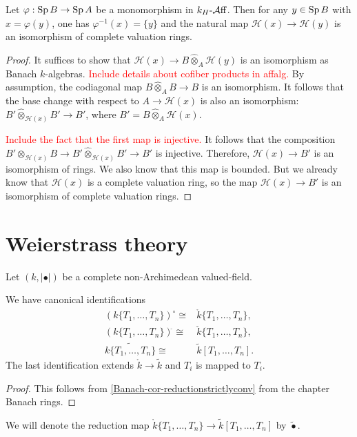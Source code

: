 \begin{proposition}
    Let $\varphi:\operatorname{Sp} B\rightarrow \operatorname{Sp} A$ be a monomorphism in $k_H\text{-}\mathcal{A}\mathrm{ff}$. Then for any $y\in \operatorname{Sp} B$ with $x=\varphi(y)$, one has $\varphi^{-1}(x)=\{y\}$ and the natural map $\mathscr{H}(x)\rightarrow \mathscr{H}(y)$ is an isomorphism of complete valuation rings.
\end{proposition}
\begin{proof}
    It suffices to show that $\mathscr{H}(x)\rightarrow B\hat{\otimes}_A \mathscr{H}(y)$ is an isomorphism as Banach $k$-algebras. \textcolor{red}{Include details about cofiber products in affalg.} By assumption, the codiagonal map $B\hat{\otimes}_A B\rightarrow B$ is an isomorphism. It follows that the base change with respect to $A\rightarrow \mathscr{H}(x)$ is also an isomorphism: $B'\hat{\otimes}_{\mathscr{H}(x)}B'\rightarrow B'$, where $B'=B\hat{\otimes}_A \mathscr{H}(x)$.

    \textcolor{red}{Include the fact that the first map is injective.}
    It follows that the composition $B'\otimes_{\mathscr{H}(x)}B\rightarrow B'\hat{\otimes}_{\mathscr{H}(x)}B'\rightarrow B'$ is injective.
    Therefore, $\mathscr{H}(x)\rightarrow B'$ is an isomorphism of rings.  We also know that this map is bounded.
    But we already know that $\mathscr{H}(x)$ is a complete valuation ring, so the map $\mathscr{H}(x)\rightarrow B'$ is an isomorphism of complete valuation rings.
\end{proof}

\section{Weierstrass theory}
Let $(k,|\bullet|)$ be a complete non-Archimedean valued-field.

\begin{proposition}\label{prop-reductionTn}
    We have canonical identifications
    \[
        \begin{aligned}
        (k\{T_1,\ldots,T_n\} )^{\circ}\cong & \mathring{k}\{T_1,\ldots,T_n\},\\
        (k\{T_1,\ldots,T_n\} )^{\check{}}\cong & \check{k}\{T_1,\ldots,T_n\},\\
        \widetilde{k\{T_1,\ldots,T_n\}  }\cong & \tilde{k}[T_1,\ldots,T_n].
        \end{aligned}
    \]
    The last identification extends $\mathring{k}\rightarrow \tilde{k}$ and $T_i$ is mapped to $T_i$.
\end{proposition}
\begin{proof}
    This follows from \cref{Banach-cor-reductionstrictlyconv} from the chapter Banach rings.
\end{proof}
We will denote the reduction map $\mathring{k}\{T_1,\ldots,T_n\}\rightarrow \tilde{k}[T_1,\ldots,T_n]$ by $\tilde{\bullet}$.

